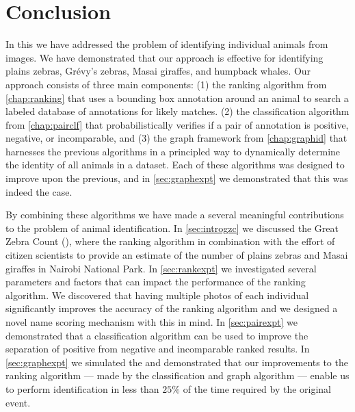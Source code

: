 \begin{comment}
    ./texfix.py --fpaths chapter6-conclusion.tex --outline --asmarkdown --numlines=99 -w
\end{comment}

\chapter{Conclusion}\label{chap:conclusion} %

    In this \thesis{} we have addressed the problem of identifying individual animals from images.
    We have demonstrated that our approach is effective for identifying plains zebras, Grévy's zebras, Masai
      giraffes, and humpback whales.
    Our approach consists of three main components:
    (1) the ranking algorithm from \cref{chap:ranking} that uses a bounding box annotation around an animal to
      search a labeled database of annotations for likely matches.
    (2) the classification algorithm from \cref{chap:pairclf} that probabilistically verifies if a pair of
      annotation is positive, negative, or incomparable, and
    (3) the graph framework from \cref{chap:graphid} that harnesses the previous algorithms in a principled way
      to dynamically determine the identity of all animals in a dataset.
    Each of these algorithms was designed to improve upon the previous, and in \cref{sec:graphexpt} we
      demonstrated that this was indeed the case.

    By combining these algorithms we have made a several meaningful contributions to the problem of animal
      identification.
    In \cref{sec:introgzc} we discussed the Great Zebra Count (\GZC{}), where the ranking algorithm in
      combination with the effort of citizen scientists to provide an estimate of the number of plains zebras and
      Masai giraffes in Nairobi National Park.
    In \cref{sec:rankexpt} we investigated several parameters and factors that can impact the performance of the
      ranking algorithm.
    We discovered that having multiple photos of each individual significantly improves the accuracy of the
      ranking algorithm and we designed a novel name scoring mechanism with this in mind.
    In \cref{sec:pairexpt} we demonstrated that a classification algorithm can be used to improve the separation
      of positive from negative and incomparable ranked results.
    In \cref{sec:graphexpt} we simulated the \GZC{} and demonstrated that our improvements to the ranking
      algorithm --- made by the classification and graph algorithm --- enable us to perform identification in less
      than $25\percent$ of the time required by the original event.

